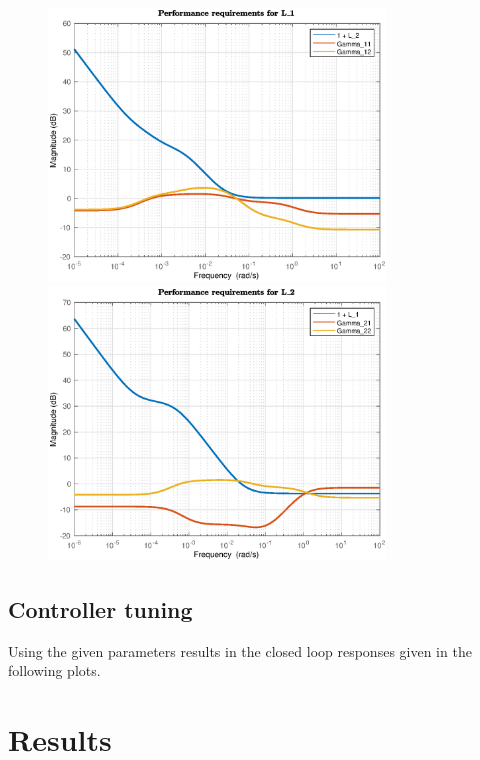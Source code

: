 \documentclass[12pt]{article}
\begin{document}
\begin{figure}[p]
\centering
\includegraphics[width=0.8\textwidth]{../Systemanalyse/Log_Data_to_Matlab/Figurer/LV_identifisering/L1_krav_PI-reg.eps}
\caption{}
\label{fig:L1_performance2}

\includegraphics[width=0.8\textwidth]{../Systemanalyse/Log_Data_to_Matlab/Figurer/LV_identifisering/L2_krav_PI-reg.eps}
\caption{}
\label{fig:L2_performance2}
\end{figure}


\subsection{Controller tuning}
Using the given parameters results in the closed loop responses given in the following plots.

\newpage
\section{Results}
\end{document}
